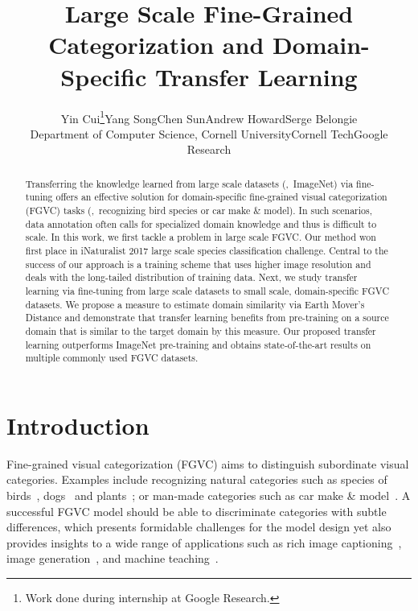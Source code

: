 \documentclass[10pt,twocolumn,letterpaper]{article}
\begin{document}
\title{Large Scale Fine-Grained Categorization and Domain-Specific Transfer Learning}

\author{Yin Cui\thanks{Work done during internship at Google Research.}\hspace{15pt}Yang Song\hspace{15pt}Chen Sun\hspace{15pt}Andrew Howard\hspace{15pt}Serge Belongie\\
Department of Computer Science, Cornell University\hspace{20pt}Cornell Tech\hspace{20pt}Google Research}


\maketitle


\begin{abstract}
Transferring the knowledge learned from large scale datasets (\eg,\ ImageNet) via fine-tuning offers an effective solution for domain-specific fine-grained visual categorization (FGVC) tasks (\eg,\ recognizing bird species or car make \& model).
In such scenarios, data annotation often calls for specialized domain knowledge and thus is difficult to scale.
In this work, we first tackle a problem in large scale FGVC. 
Our method won first place in iNaturalist 2017 large scale species classification challenge.
Central to the success of our approach is a training scheme that uses higher image resolution and deals with the long-tailed distribution of training data.
Next, we study transfer learning via fine-tuning from large scale datasets to small scale, domain-specific FGVC datasets.
We propose a measure to estimate domain similarity via Earth Mover's Distance and demonstrate that transfer learning benefits from pre-training on a source domain that is similar to the target domain by this measure. 
Our proposed transfer learning outperforms ImageNet pre-training and obtains state-of-the-art results on multiple commonly used FGVC datasets.
\end{abstract}


\section{Introduction}

Fine-grained visual categorization (FGVC) aims to distinguish subordinate visual categories. 
Examples include recognizing natural categories such as species of birds~\cite{cub200, nabirds}, dogs~\cite{stanford_dog} and plants~\cite{flower_102, urban_tree}; or man-made categories such as car make \& model~\cite{stanford_car, CompCars}.
A successful FGVC model should be able to discriminate categories with subtle differences, which presents formidable challenges for the model design yet also provides insights to a wide range of applications such as rich image captioning~\cite{anne2016deep}, image generation~\cite{CVAE-GAN}, and machine teaching~\cite{becoming_expert, mac2018teaching}.
\end{document}
